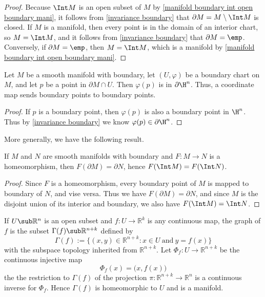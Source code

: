 \begin{proof}
Because $\Int M$ is an open subset of $M$ by \cref{manifold boundary int open boundary mani}, it follows from \cref{invariance boundary} that $\partial M=M\setminus\Int M$ is closed. If $M$ is a manifold, then every point is in the domain of an interior chart, so $M=\Int M$, and it follows from \cref{invariance boundary} that $\partial M=\emp$. Conversely, if $\partial M=\emp$, then $M=\Int M$, which is a manifold by \cref{manifold boundary int open boundary mani}.
\end{proof}
\begin{corollary}
Let $M$ be a smooth manifold with boundary, let $(U,\varphi)$ be a boundary chart
on $M$, and let $p$ be a point in $\partial M\cap U$. Then $\varphi(p)$ is in $\partial\H^n$. Thus, a coordinate map sends boundary points to boundary points.
\end{corollary}
\begin{proof}
If $p$ is a boundary point, then $\varphi(p)$ is also a boundary point in $\H^n$. Thus by \cref{invariance boundary} we know $\varphi(p)\in\partial\H^n$.
\end{proof}
More generally, we have the following result.
\begin{theorem}\label{homeomorphism invariance boundary}
If $M$ and $N$ are smooth manifolds with boundary and $F:M\to N$ is a homeomorphism, then $F(\partial M)=\partial N$, hence $F(\Int M)=F(\Int N)$.
\end{theorem}
\begin{proof}
Since $F$ is a homeomorphism, every boundary point of $M$ is mapped to boundary of $N$, and vise versa. Thus we have $F(\partial M)=\partial N$, and since $M$ is the disjoint union of its interior and boundary, we also have $F(\Int M)=\Int N$.
\end{proof}
\begin{example}\label{Graph mani}
If $U\sub\mathbb{R}^n$ is an open subset and $f:U\to\mathbb{R}^k$ is any continuous map, the graph of $f$ is the subset $\Gamma(f)\sub\mathbb{R}^{n+k}$ defined by
\[\Gamma(f):=\{(x,y)\in\mathbb{R}^{n+k}:x\in U\ \text{and}\ y=f(x)\}\]
with the subspace topology inherited from $\mathbb{R}^{n+k}$. Let $\varPhi_f:U\to\mathbb{R}^{n+k}$ be the continuous injective map
\[\varPhi_f(x)=\big(x,f(x)\big)\]
the the restriction to $\Gamma(f)$ of the projection $\pi:\mathbb{R}^{n+k}\to\mathbb{R}^{n}$ is a continuous inverse for $\Phi_f$. Hence $\Gamma(f)$ is homeomorphic to $U$ and is a manifold.
\end{example}
